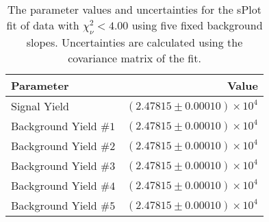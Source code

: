 
\begin{table}[ht]
    \begin{center}
        \begin{tabular}{lr}\toprule
            Parameter & Value \\\midrule
            Signal Yield & $(2.47815 \pm 0.00010) \times 10^{4}$ \\
            Background Yield $\#1$ & $(2.47815 \pm 0.00010) \times 10^{4}$ \\
            Background Yield $\#2$ & $(2.47815 \pm 0.00010) \times 10^{4}$ \\
            Background Yield $\#3$ & $(2.47815 \pm 0.00010) \times 10^{4}$ \\
            Background Yield $\#4$ & $(2.47815 \pm 0.00010) \times 10^{4}$ \\
            Background Yield $\#5$ & $(2.47815 \pm 0.00010) \times 10^{4}$ \\\bottomrule
        \end{tabular}
        \caption{The parameter values and uncertainties for the sPlot fit of data with $\chi^2_\nu < 4.00$ using five fixed background slopes. Uncertainties are calculated using the covariance matrix of the fit.}\label{tab:splot-fit-results-chisqdof-4.00-fixed-5}
    \end{center}
\end{table}
